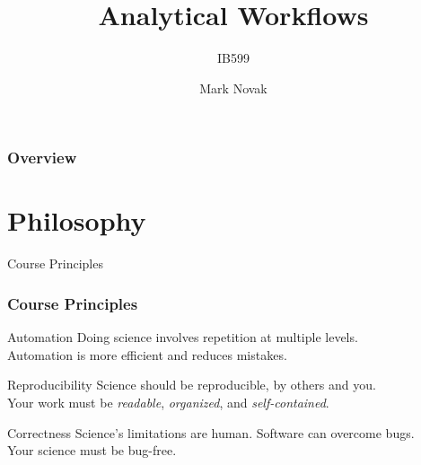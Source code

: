 \documentclass{beamer}
\title[Analytical Workflows] %
{Analytical Workflows}
\subtitle{IB599}
\author[] %
{Mark Novak}
\institute[OSU] %
{
  \inst{}%
  Dept. of Integrative Biology\\
  Oregon State University
}
\date[Fall2020] %
{}
\begin{document}
\frame{\titlepage}

\begin{frame}
    \frametitle{Overview}
    \tableofcontents
\end{frame}


\section{Philosophy}


\begin{frame}{Course Principles}
    
    \frametitle{Course Principles}

        \begin{block}{Automation}
            Doing science involves repetition at multiple levels.\\Automation is more efficient and reduces mistakes. 
        \end{block}
        
        \begin{block}{Reproducibility}
            Science should be reproducible, by others and you.\\Your work must be \emph{readable}, \emph{organized}, and \emph{self-contained}.
        \end{block}
        
        \begin{block}{Correctness}
            Science's limitations are human. Software can overcome bugs.\\Your science must be bug-free.
        \end{block}

\end{frame}
\end{document}
